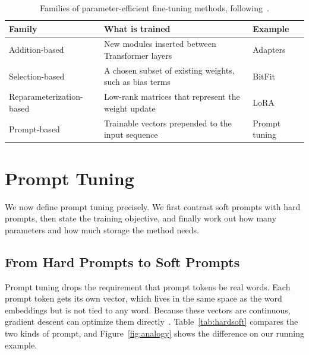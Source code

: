 \documentclass[12pt]{article}
\begin{document}
\begin{table}[htbp]
  \centering
  \caption{Families of parameter-efficient fine-tuning methods, following~\cite{li2025survey}.}
  \label{tab:peft}
  \small
  \begin{tabularx}{\textwidth}{@{}l L l@{}}
    \toprule
    \textbf{Family} & \textbf{What is trained} & \textbf{Example}\\
    \midrule
    Addition-based           & New modules inserted between Transformer layers        & Adapters\\
    Selection-based          & A chosen subset of existing weights, such as bias terms & BitFit\\
    Reparameterization-based & Low-rank matrices that represent the weight update     & LoRA\\
    Prompt-based             & Trainable vectors prepended to the input sequence      & Prompt tuning\\
    \bottomrule
  \end{tabularx}
\end{table}

\section{Prompt Tuning}\label{sec:method}

We now define prompt tuning precisely. We first contrast soft prompts with hard prompts, then
state the training objective, and finally work out how many parameters and how much storage
the method needs.

\subsection{From Hard Prompts to Soft Prompts}\label{sec:hardsoft}

Prompt tuning drops the requirement that prompt tokens be real words. Each prompt token gets
its own vector, which lives in the same space as the word embeddings but is not tied to any
word. Because these vectors are continuous, gradient descent can optimize them
directly~\cite{lester2021}. Table~\ref{tab:hardsoft} compares the two kinds of prompt, and
Figure~\ref{fig:analogy} shows the difference on our running example.
\end{document}
